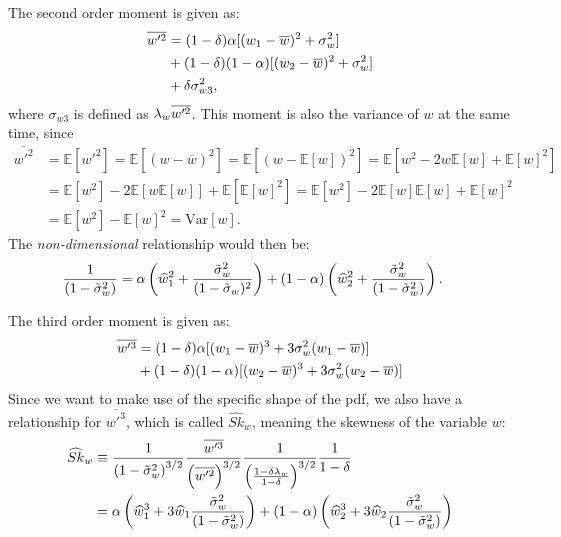 The second order moment is given as:
\begin{align}
    \label{eq:wp2_bar}
    \overline{w'^2}
    &= (1 - \delta) \alpha [(w_1 - \overline{w})^2 + \sigma_w^2] \nonumber\\
    &+ (1 - \delta) (1 - \alpha) [(w_2 - \overline{w})^2 + \sigma_w^2] \nonumber\\
    &+ \delta \sigma_{w 3}^2,
\end{align}
where $\sigma_{w 3}$ is defined as $\lambda_w \overline{w'^2}$.
This moment is also the variance of $w$ at the same time, since
\begin{align*}
    \overline{w'^2}
    &= \mathbb{E}[w'^2]
    = \mathbb{E}[(w - \overline{w})^2]
    = \mathbb{E}[(w - \mathbb{E}[w])^2]
    = \mathbb{E}[w^2 -2w\mathbb{E}[w] + \mathbb{E}[w]^2] \\
    &= \mathbb{E}[w^2] - 2\mathbb{E}[w\mathbb{E}[w]] + \mathbb{E}[\mathbb{E}[w]^2]
    = \mathbb{E}[w^2] - 2\mathbb{E}[w]\mathbb{E}[w] + \mathbb{E}[w]^2 \\
    &= \mathbb{E}[w^2] - \mathbb{E}[w]^2
    = \text{Var}[w].
\end{align*}
The \emph{non-dimensional} relationship would then be:
\begin{align}
    \label{eq:wp2_bar_non_dim}
    \frac{1}{\left( 1 - \tilde{\sigma}_w^2 \right)}
    &= \alpha \left(\widehat{w}_1^2 + \frac{\tilde{\sigma}_w^2}{(1 - \tilde{\sigma}_w)^2} \right)
    + (1-\alpha) \left( \widehat{w}_2^2 + \frac{{\tilde{\sigma}_w}^2}{\left( 1 - \tilde{\sigma}_w^2 \right)} \right).
\end{align}

The third order moment is given as:
\begin{align}
    \label{eq:wp3_bar}
    \overline{w'^3}
    &= (1 - \delta) \alpha [(w_1 - \overline{w})^3 + 3 \sigma_w^2 (w_1 - \overline{w})] \nonumber\\
    &+ (1 - \delta) (1 - \alpha) [(w_2 - \overline{w})^3 + 3 \sigma_w^2 (w_2 - \overline{w})]
\end{align}
Since we want to make use of the specific shape of the \gls{pdf},
we also have a relationship for $\overline{w'^3}$,
which is called $\widehat{Sk}_w$, meaning the skewness of the variable $w$:
\begin{align}
    \widehat{Sk}_w
    &\equiv \frac{1}{\left( 1 - \tilde{\sigma}_w^2 \right)^{3/2}}
    \frac{\overline{w'^3}}{\left( \overline{w'^2} \right)^{3/2}}
    \frac{1}{\left(\frac{1-\delta \lambda_w}{1-\delta}\right)^{3/2}}
    \frac{1}{1-\delta} \nonumber \\
    &= \alpha \left(\widehat{w}_1^3 + 3 \widehat{w}_1 \frac{{\tilde{\sigma}_w}^2}{\left( 1 - \tilde{\sigma}_w^2 \right)} \right) +
    (1 - \alpha) \left( \widehat{w}_2^3 + 3 \widehat{w}_2 \frac{{\tilde{\sigma}_w}^2}{\left( 1 - \tilde{\sigma}_w^2 \right)} \right)
    \label{eq:sk_hat_w_nondim}
\end{align}

